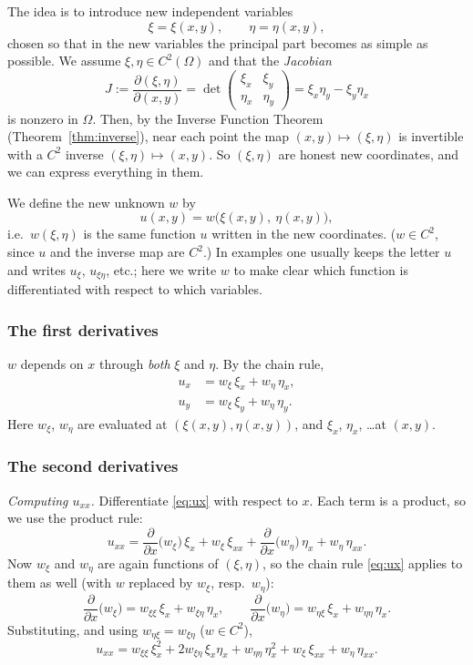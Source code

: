 \documentclass[11pt]{article}
\theoremstyle{plain}
\theoremstyle{definition}
\theoremstyle{remark}
\begin{document}
The idea is to introduce new independent variables
$$ \xi = \xi(x,y), \qquad \eta = \eta(x,y), $$
chosen so that in the new variables the principal part becomes as simple as possible. We assume $\xi, \eta \in C^2(\Omega)$ and that the \emph{Jacobian}
$$ J := \frac{\partial(\xi,\eta)}{\partial(x,y)} = \det\begin{pmatrix} \xi_x & \xi_y \\ \eta_x & \eta_y \end{pmatrix} = \xi_x\eta_y - \xi_y\eta_x $$
is nonzero in $\Omega$. Then, by the Inverse Function Theorem (Theorem~\ref{thm:inverse}), near each point the map $(x,y) \mapsto (\xi,\eta)$ is invertible with a $C^2$ inverse $(\xi,\eta) \mapsto (x,y)$. So $(\xi,\eta)$ are honest new coordinates, and we can express everything in them.

We define the new unknown $w$ by
$$ u(x,y) = w\big(\xi(x,y),\ \eta(x,y)\big), $$
i.e.\ $w(\xi,\eta)$ is the same function $u$ written in the new coordinates. ($w \in C^2$, since $u$ and the inverse map are $C^2$.) In examples one usually keeps the letter $u$ and writes $u_\xi$, $u_{\xi\eta}$, etc.; here we write $w$ to make clear which function is differentiated with respect to which variables.

\subsubsection{The first derivatives}
$w$ depends on $x$ through \emph{both} $\xi$ and $\eta$. By the chain rule,
\begin{align}
u_x &= w_\xi\,\xi_x + w_\eta\,\eta_x, \label{eq:ux}\\
u_y &= w_\xi\,\xi_y + w_\eta\,\eta_y. \label{eq:uy}
\end{align}
Here $w_\xi$, $w_\eta$ are evaluated at $(\xi(x,y),\eta(x,y))$, and $\xi_x$, $\eta_x$, \dots at $(x,y)$.

\subsubsection{The second derivatives}
\emph{Computing $u_{xx}$.} Differentiate \eqref{eq:ux} with respect to $x$. Each term is a product, so we use the product rule:
$$ u_{xx} = \frac{\partial}{\partial x}\big(w_\xi\big)\,\xi_x + w_\xi\,\xi_{xx} + \frac{\partial}{\partial x}\big(w_\eta\big)\,\eta_x + w_\eta\,\eta_{xx}. $$
Now $w_\xi$ and $w_\eta$ are again functions of $(\xi,\eta)$, so the chain rule \eqref{eq:ux} applies to them as well (with $w$ replaced by $w_\xi$, resp.\ $w_\eta$):
$$ \frac{\partial}{\partial x}\big(w_\xi\big) = w_{\xi\xi}\,\xi_x + w_{\xi\eta}\,\eta_x, \qquad \frac{\partial}{\partial x}\big(w_\eta\big) = w_{\eta\xi}\,\xi_x + w_{\eta\eta}\,\eta_x. $$
Substituting, and using $w_{\eta\xi} = w_{\xi\eta}$ ($w \in C^2$),
\begin{equation}\label{eq:uxx}
u_{xx} = w_{\xi\xi}\,\xi_x^2 + 2w_{\xi\eta}\,\xi_x\eta_x + w_{\eta\eta}\,\eta_x^2 + w_\xi\,\xi_{xx} + w_\eta\,\eta_{xx}.
\end{equation}
\end{document}

